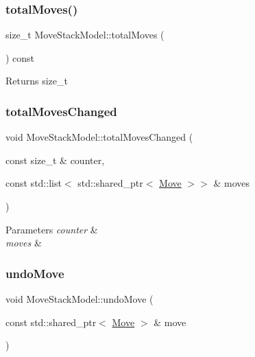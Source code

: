 \subsubsection{\texorpdfstring{totalMoves()}{totalMoves()}}
{\footnotesize\ttfamily size\+\_\+t Move\+Stack\+Model\+::total\+Moves (\begin{DoxyParamCaption}{ }\end{DoxyParamCaption}) const\hspace{0.3cm}{\ttfamily [inline]}}

\begin{DoxyReturn}{Returns}
size\+\_\+t 
\end{DoxyReturn}
\mbox{\label{class_move_stack_model_a8b596d9619735fc7d066a3d0e1b8cc55}} 
\subsubsection{\texorpdfstring{totalMovesChanged}{totalMovesChanged}}
{\footnotesize\ttfamily void Move\+Stack\+Model\+::total\+Moves\+Changed (\begin{DoxyParamCaption}\item[{const size\+\_\+t \&}]{counter,  }\item[{const std\+::list$<$ std\+::shared\+\_\+ptr$<$ \mbox{\hyperlink{struct_move}{Move}} $>$$>$ \&}]{moves }\end{DoxyParamCaption})\hspace{0.3cm}{\ttfamily [signal]}}


\begin{DoxyParams}{Parameters}
{\em counter} & \\
\hline
{\em moves} & \\
\hline
\end{DoxyParams}
\mbox{\label{class_move_stack_model_a16436cf5acda5455355c24f28586f1e8}} 
\subsubsection{\texorpdfstring{undoMove}{undoMove}}
{\footnotesize\ttfamily void Move\+Stack\+Model\+::undo\+Move (\begin{DoxyParamCaption}\item[{const std\+::shared\+\_\+ptr$<$ \mbox{\hyperlink{struct_move}{Move}} $>$ \&}]{move }\end{DoxyParamCaption})\hspace{0.3cm}{\ttfamily [signal]}}


